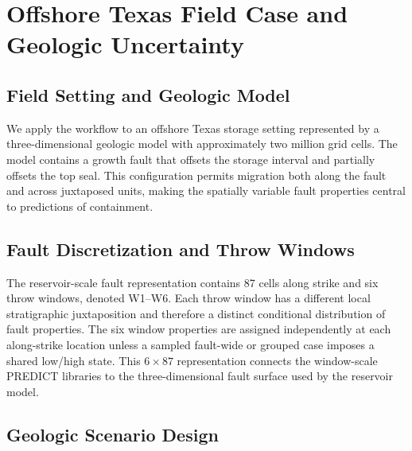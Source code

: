 
\section{Offshore Texas Field Case and Geologic Uncertainty}

\subsection{Field Setting and Geologic Model}

We apply the workflow to an offshore Texas storage setting represented by a
three-dimensional geologic model with approximately two million grid cells.
The model contains a growth fault that offsets the storage interval and
partially offsets the top seal. This configuration permits migration both
along the fault and across juxtaposed units, making the spatially variable
fault properties central to predictions of containment.


\subsection{Fault Discretization and Throw Windows}

The reservoir-scale fault representation contains 87 cells along strike and
six throw windows, denoted W1--W6. Each throw window has a different local
stratigraphic juxtaposition and therefore a distinct conditional distribution
of fault properties. The six window properties are assigned independently at
each along-strike location unless a sampled fault-wide or grouped case imposes
a shared low/high state. This $6\times87$ representation connects the
window-scale PREDICT libraries to the three-dimensional fault surface used by
the reservoir model.


\subsection{Geologic Scenario Design}

